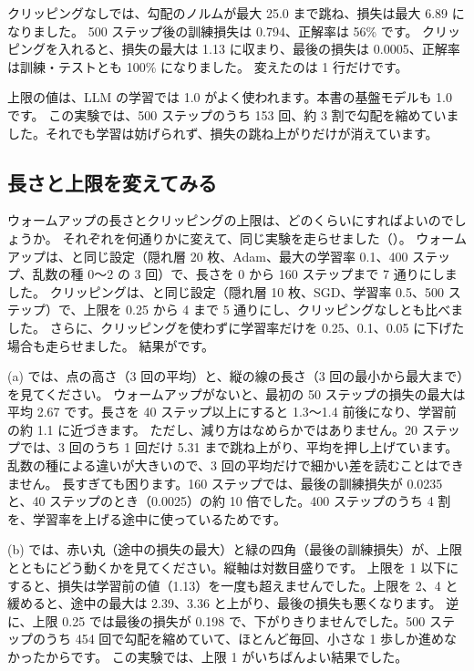 クリッピングなしでは、勾配のノルムが最大 25.0 まで跳ね、損失は最大 6.89 になりました。
500 ステップ後の訓練損失は 0.794、正解率は 56\% です。
クリッピングを入れると、損失の最大は 1.13 に収まり、最後の損失は 0.0005、正解率は訓練・テストとも 100\% になりました。
変えたのは 1 行だけです。

上限の値は、LLM の学習では 1.0 がよく使われます。本書の基盤モデルも 1.0 です。
この実験では、500 ステップのうち 153 回、約 3 割で勾配を縮めていました。それでも学習は妨げられず、損失の跳ね上がりだけが消えています。

\subsection*{長さと上限を変えてみる}

ウォームアップの長さとクリッピングの上限は、どのくらいにすればよいのでしょうか。
それぞれを何通りかに変えて、同じ実験を走らせました（）。
ウォームアップは、と同じ設定（隠れ層 20 枚、Adam、最大の学習率 0.1、400 ステップ、乱数の種 0〜2 の 3 回）で、長さを 0 から 160 ステップまで 7 通りにしました。
クリッピングは、と同じ設定（隠れ層 10 枚、SGD、学習率 0.5、500 ステップ）で、上限を 0.25 から 4 まで 5 通りにし、クリッピングなしとも比べました。
さらに、クリッピングを使わずに学習率だけを 0.25、0.1、0.05 に下げた場合も走らせました。
結果がです。

(a) では、点の高さ（3 回の平均）と、縦の線の長さ（3 回の最小から最大まで）を見てください。
ウォームアップがないと、最初の 50 ステップの損失の最大は平均 2.67 です。長さを 40 ステップ以上にすると 1.3〜1.4 前後になり、学習前の約 1.1 に近づきます。
ただし、減り方はなめらかではありません。20 ステップでは、3 回のうち 1 回だけ 5.31 まで跳ね上がり、平均を押し上げています。
乱数の種による違いが大きいので、3 回の平均だけで細かい差を読むことはできません。
長すぎても困ります。160 ステップでは、最後の訓練損失が 0.0235 と、40 ステップのとき（0.0025）の約 10 倍でした。400 ステップのうち 4 割を、学習率を上げる途中に使っているためです。

(b) では、赤い丸（途中の損失の最大）と緑の四角（最後の訓練損失）が、上限とともにどう動くかを見てください。縦軸は対数目盛りです。
上限を 1 以下にすると、損失は学習前の値（1.13）を一度も超えませんでした。上限を 2、4 と緩めると、途中の最大は 2.39、3.36 と上がり、最後の損失も悪くなります。
逆に、上限 0.25 では最後の損失が 0.198 で、下がりきりませんでした。500 ステップのうち 454 回で勾配を縮めていて、ほとんど毎回、小さな 1 歩しか進めなかったからです。
この実験では、上限 1 がいちばんよい結果でした。

